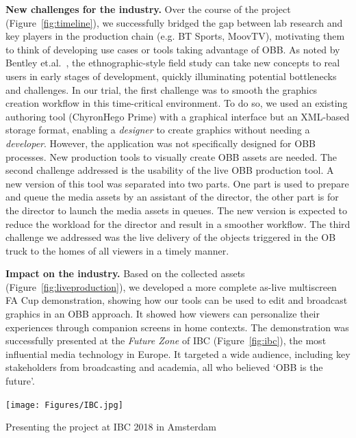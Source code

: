 \documentclass[sigchi-a, authorversion]{acmart}
\begin{document}
\textbf{New challenges for the industry.} Over the course of the project
(Figure~\ref{fig:timeline}), we successfully bridged the gap between lab
research and key players in the production chain (e.g. BT Sports, MoovTV),
motivating them to think of developing use cases or tools taking advantage of
OBB\@. As noted by Bentley et.al.~\cite{bentley2009}, the ethnographic-style
field study can take new concepts to real users in early stages of development,
quickly illuminating potential bottlenecks and challenges. In our trial, the
first challenge was to smooth the graphics creation workflow in this
time-critical environment. To do so, we used an existing authoring tool
(ChyronHego Prime) with a graphical interface but an XML-based storage format,
enabling a \textit{designer} to create graphics without needing a
\textit{developer}. However, the application was not specifically designed for
OBB processes. New production tools to visually create OBB assets are needed.
The second challenge addressed is the usability of the live OBB production
tool. A new version of this tool was separated into two parts.  One part is
used to prepare and queue the media assets by an assistant of the director, the
other part is for the director to launch the media assets in queues. The new
version is expected to reduce the workload for the director and result in a
smoother workflow. The third challenge we addressed was the live delivery of
the objects triggered in the OB truck to the homes of all viewers in a timely
manner.

\vspace{5pt}\noindent\textbf{Impact on the industry.} Based on the collected assets
(Figure~\ref{fig:liveproduction}), we developed a more complete as-live multiscreen
FA Cup demonstration, showing how our tools can be used to edit and broadcast
graphics in an OBB approach. It showed how viewers can personalize their experiences
through companion screens in home contexts. The
demonstration was successfully presented at the \emph{Future Zone} of IBC
(Figure~\ref{fig:ibc}), the most influential media technology in Europe. It targeted a wide audience, including key stakeholders from broadcasting and academia, all who believed `OBB is the future'.

\begin{marginfigure}
    \hspace*{-1cm}
    \texttt{[image: Figures/IBC.jpg]}
    \caption{Presenting the project at IBC 2018 in Amsterdam}
    \label{fig:ibc}
\end{marginfigure}
\end{document}
